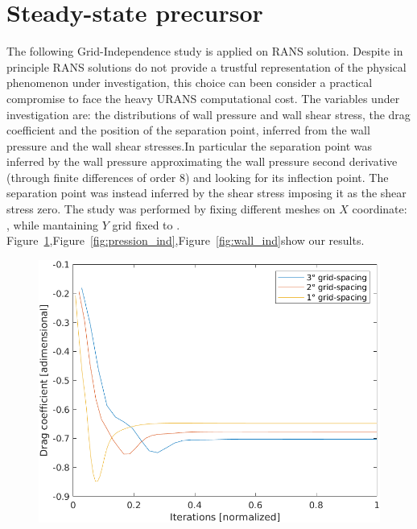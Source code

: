 \documentclass[12pt]{article}
\begin{document}
      
      
\section{Steady-state precursor} \label{sec:Steady-state precursor}

The following Grid-Independence study is applied on RANS solution.   Despite in principle RANS solutions do not provide a trustful representation of the physical phenomenon under investigation, this choice can been consider a practical compromise to face the heavy URANS  computational cost. The variables under investigation are:  the distributions of wall pressure and wall shear stress, the drag coefficient and the position of the separation point, inferred from the wall pressure and the wall shear stresses.In particular the separation point was inferred by the wall pressure approximating the wall pressure second derivative (through finite differences of order 8) and looking for its inflection point. The separation point was instead inferred by the shear stress imposing it as the shear stress zero.
The study was performed by fixing  different meshes on $X$ coordinate: , while mantaining $Y$ grid fixed to . 
Figure~\ref{fig:drag_independence},Figure~\ref{fig:pression_ind},Figure~\ref{fig:wall_ind}show our results.
        \begin{figure}[!ht]
                \includegraphics[width=\textwidth]{DragCoefficient_Independence.png}
                \centering
                \caption{}
                \label{fig:drag_independence}
        \end{figure}
\end{document}
